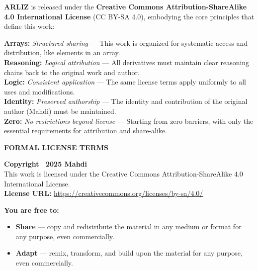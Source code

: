 \begin{flushleft}
	{\small
		\textbf{ARLIZ} is released under the \textbf{Creative Commons Attribution-ShareAlike 4.0 International License} (CC BY-SA 4.0), embodying the core principles that define this work:
		
		\vspace{1em}
		
		\vspace{0.8em}
		\textbf{Arrays:} \textit{Structured sharing} — This work is organized for systematic access and distribution, like elements in an array.\\[0.4em]
		\textbf{Reasoning:} \textit{Logical attribution} — All derivatives must maintain clear reasoning chains back to the original work and author.\\[0.4em]
		\textbf{Logic:} \textit{Consistent application} — The same license terms apply uniformly to all uses and modifications.\\[0.4em]
		\textbf{Identity:} \textit{Preserved authorship} — The identity and contribution of the original author (Mahdi) must be maintained.\\[0.4em]
		\textbf{Zero:} \textit{No restrictions beyond license} — Starting from zero barriers, with only the essential requirements for attribution and share-alike.
		
		\vspace{1.5em}
		
		\begin{center}
			\textbf{FORMAL LICENSE TERMS}
		\end{center}
		
		\textbf{Copyright \textcopyright\ 2025 Mahdi}\\
		This work is licensed under the Creative Commons Attribution-ShareAlike 4.0 International License.\\
		\textbf{License URL:} \url{https://creativecommons.org/licenses/by-sa/4.0/}
		
		\vspace{1em}
		\textbf{You are free to:}
		\begin{itemize}\itemsep2pt
			\item \textbf{Share} — copy and redistribute the material in any medium or format for any purpose, even commercially.
			\item \textbf{Adapt} — remix, transform, and build upon the material for any purpose, even commercially.
		\end{itemize}
		
}
\end{flushleft}

